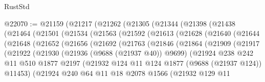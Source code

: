 \begin{lexlean}{RustStd}
\begin{coremodule}
@22070 := @21159
    (@21217
      (@21262
        (@21305
          (@21344
            (@21398
              (@21438
                (@21464
                  (@21501
                    (@21534
                      (@21563
                        (@21592
                          (@21613
                            (@21628
                              (@21640
                                (@21644
                                  (@21648
                                    (@21652
                                      (@21656
                                        (@21692
                                          (@21763
                                            (@21846
                                              (@21864
                                                (@21909
                                                  (@21917
                                                    (@21922
                                                      (@21930
                                                        (@21936 (@9688 (@21937 @40)) @9699)
                                                        (@21924
                                                          @238
                                                          @242
                                                          @11
                                                          @510
                                                          @1877
                                                          @2197
                                                          (@21932
                                                            @124
                                                            @11
                                                            @124
                                                            @1877
                                                            (@9688 (@21937 @124))
                                                            @11453)
                                                          (@21924
                                                            @240
                                                            @64
                                                            @11
                                                            @18
                                                            @2078
                                                            @1566
                                                            (@21932
                                                              @129
                                                              @11

\end{coremodule}
\end{lexlean}
